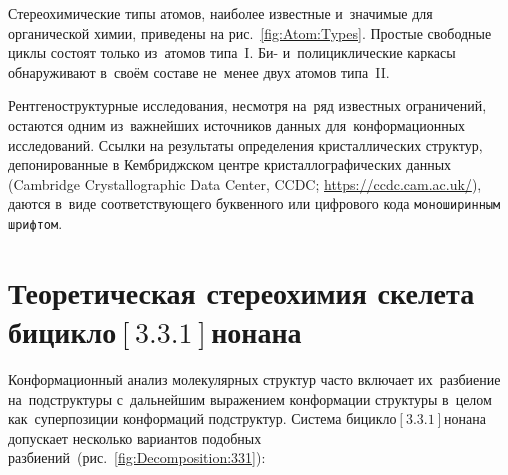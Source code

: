 Стереохимические типы атомов, наиболее известные и~значимые для органической химии, приведены на рис.~\ref{fig:Atom:Types}.
Простые свободные циклы состоят только из~атомов типа~I. Би- и~полициклические каркасы обнаруживают в~своём составе не~менее двух атомов типа~II.

Рентгеноструктурные исследования, несмотря на~ряд известных ограничений, остаются одним из~важнейших источников данных для~конформационных исследований.
Ссылки на результаты определения кристаллических структур, депонированные в Кембриджском центре кристаллографических данных (Cambridge Crystallographic Data Center, CCDC; \url{https://ccdc.cam.ac.uk/}), даются в~виде соответствующего буквенного или цифрового кода \texttt{моноширинным шрифтом}.

\section{Теоретическая стереохимия скелета бицикло$[3.3.1]$нонана}

Конформационный анализ молекулярных структур часто включает их~разбиение
на~подструктуры с~дальнейшим выражением конформации структуры в~целом
как~суперпозиции конформаций подструктур. Система
бицикло$[3.3.1]$нонана~ допускает несколько вариантов подобных
разбиений~(рис.~\ref{fig:Decomposition:331}):

